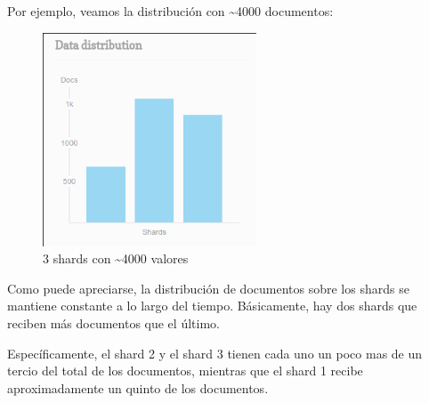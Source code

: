 Por ejemplo, veamos la distribución con \textasciitilde 4000 documentos:
\begin{figure}[H]
 \centering
 \includegraphics[width=2.5in]{sharding/img/3shard4000.png}
 \caption{3 shards con \textasciitilde 4000 valores}
 \label{fig:3shard4000}
\end{figure}

Como puede apreciarse, la distribución de documentos sobre los shards se mantiene constante a lo largo del tiempo. Básicamente, hay dos shards que reciben más documentos que el último.

Específicamente, el shard 2 y el shard 3 tienen cada uno un poco mas de un tercio del total de los documentos, mientras que el shard 1 recibe aproximadamente un quinto de los documentos.
